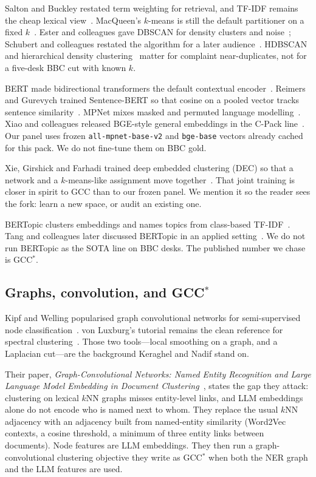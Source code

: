 \documentclass[11pt,a4paper]{article}
\begin{document}
Salton and Buckley restated term weighting for retrieval, and
TF-IDF remains the cheap lexical view~\cite{salton1988term}.
MacQueen's $k$-means is still the default partitioner on a
fixed $k$~\cite{macqueen1967}. Ester and colleagues gave
DBSCAN for density clusters and noise~\cite{ester1996dbscan};
Schubert and colleagues restated the algorithm for a later
audience~\cite{schubert2017dbscan}. HDBSCAN and hierarchical
density clustering~\cite{campello2013hdbscan,mcinnes2017hdbscan}
matter for complaint near-duplicates, not for a five-desk BBC
cut with known $k$.

BERT made bidirectional transformers the default contextual
encoder~\cite{devlin2019bert}. Reimers and Gurevych trained
Sentence-BERT so that cosine on a pooled vector tracks
sentence similarity~\cite{reimers2019sbert}. MPNet mixes masked
and permuted language modelling~\cite{song2020mpnet}. Xiao and
colleagues released BGE-style general embeddings in the C-Pack
line~\cite{xiao2023cpack}. Our panel uses frozen
\texttt{all-mpnet-base-v2} and \texttt{bge-base} vectors already
cached for this pack. We do not fine-tune them on BBC gold.

Xie, Girshick and Farhadi trained deep embedded clustering (DEC)
so that a network and a $k$-means-like assignment move
together~\cite{xie2016dec}. That joint training is closer in
spirit to GCC than to our frozen panel. We mention it so the
reader sees the fork: learn a new space, or audit an existing
one.

BERTopic clusters embeddings and names topics from
class-based TF-IDF~\cite{grootendorst2022bertopic}. Tang and
colleagues later discussed BERTopic in an applied
setting~\cite{tang2024bertopic}. We do not run BERTopic as the
SOTA line on BBC desks. The published number we chase is GCC$^*$.

\subsection{Graphs, convolution, and GCC$^*$}

Kipf and Welling popularised graph convolutional networks for
semi-supervised node classification~\cite{kipf2017gcn}. von
Luxburg's tutorial remains the clean reference for spectral
clustering~\cite{vonluxburg2007tutorial}. Those two tools---local
smoothing on a graph, and a Laplacian cut---are the background
Keraghel and Nadif stand on.

Their paper, \emph{Graph-Convolutional Networks: Named Entity
Recognition and Large Language Model Embedding in Document
Clustering}~\cite{keraghel2024gcc}, states the gap they attack:
clustering on lexical $k$NN graphs misses entity-level links, and
LLM embeddings alone do not encode who is named next to whom.
They replace the usual $k$NN adjacency with an adjacency built
from named-entity similarity (Word2Vec contexts, a cosine
threshold, a minimum of three entity links between documents).
Node features are LLM embeddings. They then run a
graph-convolutional clustering objective they write as GCC$^*$
when both the NER graph and the LLM features are used.
\end{document}

